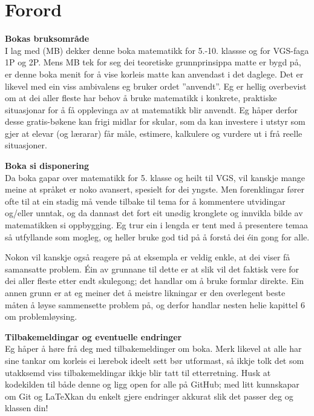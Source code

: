 


\newpage
\section*{Forord}
\textbf{Bokas bruksområde}\\
I lag med  (MB) dekker denne boka matematikk for 5.-10. klassse og for VGS-faga 1P og 2P. Mens MB tek for seg dei teoretiske grunnprinsippa matte er bygd på, er denne boka menit for å vise korleis matte kan anvendast i det daglege. Det er likevel med ein viss ambivalens eg bruker ordet ''anvendt''. Eg er hellig overbevist om at dei aller fleste har behov å bruke matematikk i konkrete, praktiske situasjonar for å få opplevinga av at matematikk blir anvendt. Eg håper derfor desse gratis-bøkene kan frigi midlar for skular, som da kan investere i utstyr som gjer at elevar (og lærarar) får måle, estimere, kalkulere og vurdere ut i frå reelle situasjoner.\vsk

\textbf{Boka si disponering} \\
Da boka gapar over matematikk for 5. klasse og heilt til VGS, vil kanskje mange meine at språket er noko avansert, spesielt for dei yngste. Men forenklingar fører ofte til at ein stadig må vende tilbake til tema for å kommentere utvidingar og/eller unntak, og da dannast det fort eit unødig kronglete og innvikla bilde av matematikken si oppbygging. Eg trur ein i lengda er tent med å presentere temaa så utfyllande som mogleg, og heller bruke god tid på å forstå dei éin gong for alle.\vsk

Nokon vil kanskje også reagere på at eksempla er veldig enkle, at dei viser få samansatte problem. Éin av grunnane til dette er at slik vil det faktisk vere for dei aller fleste etter endt skulegong; det handlar om å bruke formlar direkte. Ein annen grunn er at eg meiner det å meistre likningar er den overlegent beste måten å løyse sammensette problem på, og derfor handlar nesten helie kapittel 6 om problemløysing.\vsk


\textbf{Tilbakemeldingar og eventuelle endringer} \\
Eg håper å høre frå deg med tilbakemeldinger om boka. Merk likevel at alle har sine tankar om korleis ei lærebok ideelt sett bør utformast, så ikkje tolk det som utakksemd viss tilbakemeldingar ikkje blir tatt til etterretning. Husk at kodekilden til både denne  og \mb\;ligg open for alle på GitHub; med litt kunnskapar om Git og \LaTeX kan du enkelt gjere endringer akkurat slik det passer deg og klassen din!


